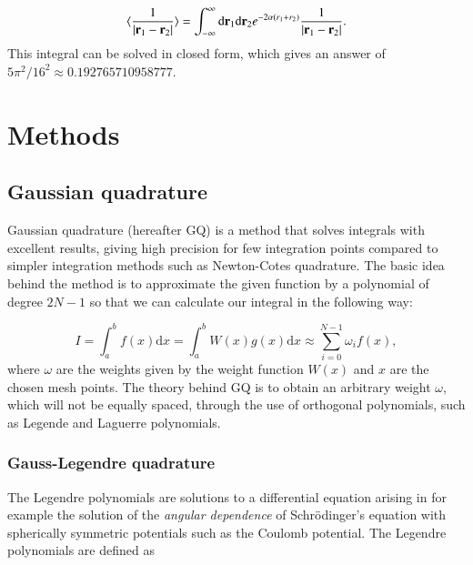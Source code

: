 \documentclass{article}
\begin{document}
\begin{equation}\label{eq:correlationenergy}
	\langle \frac{1}{|{\bf r}_1-{\bf r}_2|} \rangle = \int_{-\infty}^{\infty} \mathrm{d}{\bf r}_1\mathrm{d}{\bf r}_2  e^{-2\alpha (r_1+r_2)}\frac{1}{|{\bf r}_1-{\bf r}_2|}.
\end{equation}
This integral can be solved in closed form, which gives an answer of $5\pi^2/16^2 \approx 0.192765710958777$.



\section{Methods}

\subsection{Gaussian quadrature}
Gaussian quadrature (hereafter GQ) is a method that solves integrals with excellent results, giving high precision for few integration points compared to simpler integration methods such as Newton-Cotes quadrature. The basic idea behind the method is to approximate the given function by a polynomial of degree $2N-1$ so that we can calculate our integral in the following way:

\begin{equation}
	I = \int_a^b f(x) \mathrm{d}x = \int_a^b W(x) g(x) \mathrm{d}x \approx \sum_{i = 0}^{N-1} \omega_i f(x),
\end{equation}
where $\omega$ are the weights given by the weight function $W(x)$ and $x$ are the chosen mesh points. The theory behind GQ is to obtain an arbitrary weight $\omega$, which will not be equally spaced, through the use of orthogonal polynomials, such as Legende and Laguerre polynomials. 

%
%


\subsubsection{Gauss-Legendre quadrature}
The Legendre polynomials are solutions to a differential equation arising in for example the solution of the \textit{angular dependence} of Schr\"{o}dinger's equation with spherically symmetric potentials such as the Coulomb potential. The Legendre polynomials are defined as
\end{document}
